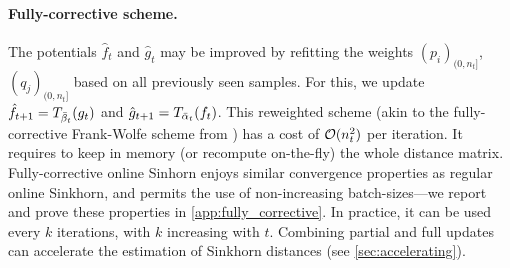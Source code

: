 

\paragraph{Fully-corrective scheme.} 

The potentials $\hat f_t$ and $\hat g_t$ may be improved by refitting the
weights $(p_i)_{(0, n_t]}$, $(q_j)_{(0, n_t]}$ based on all previously seen
samples.  For this, we update $\hat f_{t+1} = \Ctrans{g_t}{\bar \beta_t}$ and
$\hat g_{t+1} = \Ctrans{f_t}{\bar \alpha_t}$. This reweighted scheme (akin to
the fully-corrective Frank-Wolfe scheme from \cite{lacoste2015global}) has a
cost of $\Oo(n_t^2)$ per iteration. It requires to keep in memory (or recompute
on-the-fly) the whole distance matrix. Fully-corrective online Sinhorn  enjoys
similar convergence properties as regular online Sinkhorn, and permits the use
of non-increasing batch-sizes---we report and prove these properties in
\autoref{app:fully_corrective}. In practice, it can be used every $k$
iterations, with $k$ increasing with $t$. Combining partial and full updates can
accelerate the estimation of Sinkhorn distances (see \autoref{sec:accelerating}).



